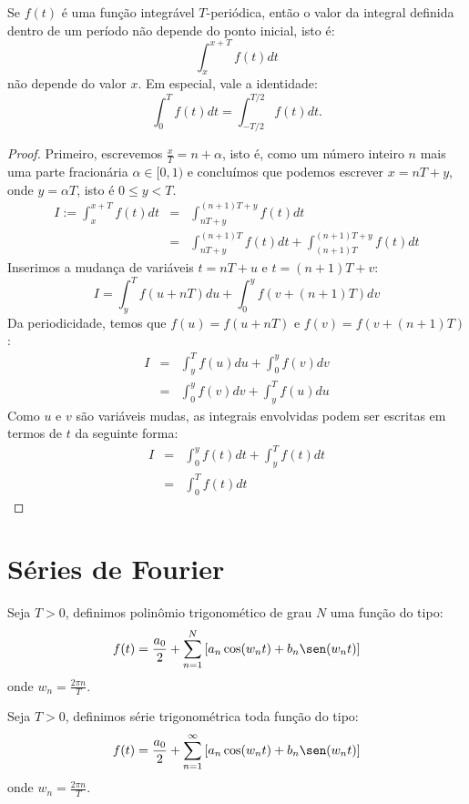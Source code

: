 \begin{teo} Se $f(t)$ é uma função integrável $T$-periódica, então o valor da integral definida dentro de um período não depende do ponto inicial, isto é:
$$\int_{x}^{x+T} f(t)dt $$
não depende do valor $x$. Em especial, vale a identidade:
$$\int_{0}^{T} f(t)dt= \int_{-T/2}^{T/2} f(t)dt.$$
 \end{teo}

\begin{proof}
 Primeiro, escrevemos  $\frac{x}{T}=n+\alpha$, isto é, como um número inteiro $n$ mais uma parte fracionária $\alpha\in [0,1)$ e concluímos que podemos escrever $x=nT+y$, onde $y=\alpha T$, isto é $0\leq y <T$.
 \begin{eqnarray*}
  I:=\int_{x}^{x+T} f(t)dt&=& \int_{nT+y}^{(n+1)T+y} f(t)dt\\
  &=&\int_{nT+y}^{(n+1)T} f(t)dt+\int_{(n+1)T}^{(n+1)T+y} f(t)dt
  \end{eqnarray*}
  Inserimos a mudança de variáveis $t=nT+u$ e $t=(n+1)T+v$:
  $$I=\int_{y}^{T} f(u+nT)du+\int_{0}^{y} f(v+(n+1)T)dv$$
   Da periodicidade, temos que $f(u)=f(u+nT)$ e $f(v)=f(v+(n+1)T)$:
   \begin{eqnarray*}
  I&=&\int_{y}^{T} f(u)du+\int_{0}^{y} f(v)dv\\
  &=&\int_{0}^{y} f(v)dv+\int_{y}^{T} f(u)du
  \end{eqnarray*}
  Como $u$ e $v$ são variáveis mudas, as integrais envolvidas podem ser escritas em termos de $t$ da seguinte forma:
   \begin{eqnarray*}
  I&=&\int_{0}^{y} f(t)dt+\int_{y}^{T} f(t)dt\\
  &=&\int_{0}^{T} f(t)dt
  \end{eqnarray*}
\end{proof}

\section{Séries de Fourier}
\begin{defn} Seja $T>0$, definimos polinômio trigonomético de grau $N$ uma função do tipo:
$$f(t)=\frac{a_0}{2}+ \sum_{n=1}^N \left[a_n \cos(w_n t) + b_n \sen(w_nt)\right] $$
onde $w_n=\frac{2\pi n}{T}$.
\end{defn}

\begin{defn} Seja $T>0$, definimos série trigonométrica toda função do tipo:
$$f(t)=\frac{a_0}{2}+ \sum_{n=1}^\infty \left[a_n \cos(w_n t) + b_n \sen(w_n t)\right] $$
onde $w_n=\frac{2\pi n}{T}$.
\end{defn}
 
